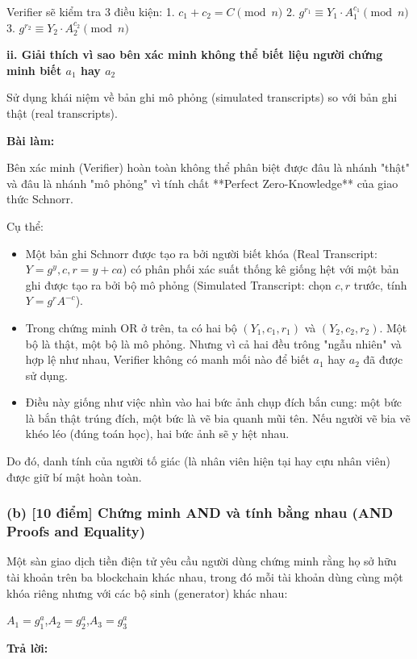 Verifier sẽ kiểm tra 3 điều kiện:
1. $c_1 + c_2 = C \pmod{n}$
2. $g^{r_1} \equiv Y_1 \cdot A_1^{c_1} \pmod{n}$
3. $g^{r_2} \equiv Y_2 \cdot A_2^{c_2} \pmod{n}$

\textbf{ii. Giải thích vì sao bên xác minh không thể biết liệu người chứng minh biết $a_1$ hay $a_2$}

Sử dụng khái niệm về bản ghi mô phỏng (simulated transcripts) so với bản ghi thật (real transcripts).

\textbf{Bài làm:}

Bên xác minh (Verifier) hoàn toàn không thể phân biệt được đâu là nhánh "thật" và đâu là nhánh "mô phỏng" vì tính chất **Perfect Zero-Knowledge** của giao thức Schnorr.

Cụ thể:
\begin{itemize}
    \item Một bản ghi Schnorr được tạo ra bởi người biết khóa (Real Transcript: $Y=g^y, c, r=y+ca$) có phân phối xác suất thống kê giống hệt với một bản ghi được tạo ra bởi bộ mô phỏng (Simulated Transcript: chọn $c, r$ trước, tính $Y=g^r A^{-c}$).
    \item Trong chứng minh OR ở trên, ta có hai bộ $(Y_1, c_1, r_1)$ và $(Y_2, c_2, r_2)$. Một bộ là thật, một bộ là mô phỏng. Nhưng vì cả hai đều trông "ngẫu nhiên" và hợp lệ như nhau, Verifier không có manh mối nào để biết $a_1$ hay $a_2$ đã được sử dụng.
    \item Điều này giống như việc nhìn vào hai bức ảnh chụp đích bắn cung: một bức là bắn thật trúng đích, một bức là vẽ bia quanh mũi tên. Nếu người vẽ bia vẽ khéo léo (đúng toán học), hai bức ảnh sẽ y hệt nhau.
\end{itemize}
Do đó, danh tính của người tố giác (là nhân viên hiện tại hay cựu nhân viên) được giữ bí mật hoàn toàn.

\vspace{0.5cm}

\subsubsection{(b) [10 điểm] Chứng minh AND và tính bằng nhau (AND Proofs and Equality)}

Một sàn giao dịch tiền điện tử yêu cầu người dùng chứng minh rằng họ sở hữu tài khoản trên ba blockchain khác nhau, trong đó mỗi tài khoản dùng cùng một khóa riêng nhưng với các bộ sinh (generator) khác nhau:

$A_1 = g_1^a$,\quad $A_2 = g_2^a$,\quad $A_3 = g_3^a$

\begin{center}
    \textbf{Trả lời:}
\end{center}

